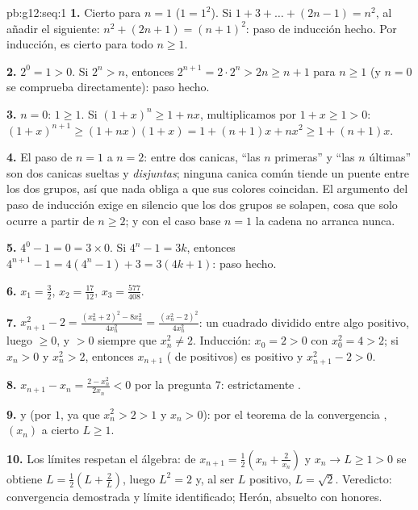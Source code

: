 \begin{solution}{pb:g12:seq:1}
\textbf{1.} Cierto para $n = 1$ ($1 = 1^2$). Si
$1 + 3 + \dots + (2n - 1) = n^2$, al añadir el  siguiente:
$n^2 + (2n + 1) = (n + 1)^2$: paso de inducción hecho. Por inducción, es
cierto para todo $n \geq 1$.

\textbf{2.} $2^0 = 1 > 0$. Si $2^n > n$, entonces
$2^{n+1} = 2 \cdot 2^n > 2n \geq n + 1$ para $n \geq 1$ (y $n = 0$ se
comprueba directamente): paso hecho.

\textbf{3.} $n = 0$: $1 \geq 1$. Si $(1 + x)^n \geq 1 + nx$, multiplicamos
por $1 + x \geq 1 > 0$:
$(1 + x)^{n+1} \geq (1 + nx)(1 + x) = 1 + (n + 1)x + nx^2
\geq 1 + (n + 1)x$.

\textbf{4.} El paso de $n = 1$ a $n = 2$: entre dos canicas, ``las $n$
primeras'' y ``las $n$ últimas'' son dos canicas sueltas y
\emph{disjuntas}; ninguna canica común tiende un puente entre los dos
grupos, así que nada obliga a que sus colores coincidan. El argumento del
paso de inducción exige en silencio que los dos grupos se solapen, cosa
que solo ocurre a partir de $n \geq 2$; y con el caso base $n = 1$ la
cadena no arranca nunca.

\textbf{5.} $4^0 - 1 = 0 = 3 \times 0$. Si $4^n - 1 = 3k$, entonces
$4^{n+1} - 1 = 4(4^n - 1) + 3 = 3(4k + 1)$: paso hecho.

\textbf{6.} $x_1 = \frac32$, $x_2 = \frac{17}{12}$,
$x_3 = \frac{577}{408}$.

\textbf{7.} $x_{n+1}^2 - 2 = \frac{(x_n^2 + 2)^2 - 8x_n^2}{4x_n^2} =
\frac{(x_n^2 - 2)^2}{4 x_n^2}$: un cuadrado dividido entre algo positivo,
luego $\geq 0$, y $> 0$ siempre que $x_n^2 \neq 2$. Inducción:
$x_0 = 2 > 0$ con $x_0^2 = 4 > 2$; si $x_n > 0$ y $x_n^2 > 2$, entonces
$x_{n+1}$ ( de positivos) es positivo y $x_{n+1}^2 - 2 > 0$.

\textbf{8.} $x_{n+1} - x_n = \frac{2 - x_n^2}{2x_n} < 0$ por la pregunta
7: estrictamente .

\textbf{9.}  y  (por $1$, ya que
$x_n^2 > 2 > 1$ y $x_n > 0$): por el teorema de la convergencia ,
$(x_n)$  a cierto $L \geq 1$.

\textbf{10.} Los límites respetan el álgebra: de
$x_{n+1} = \frac12\left(x_n + \frac{2}{x_n}\right)$ y
$x_n \to L \geq 1 > 0$ se obtiene $L = \frac12\left(L + \frac2L\right)$,
luego $L^2 = 2$ y, al ser $L$ positivo, $L = \sqrt2$. Veredicto:
convergencia demostrada y límite identificado; Herón, absuelto con
honores.


\end{solution}
